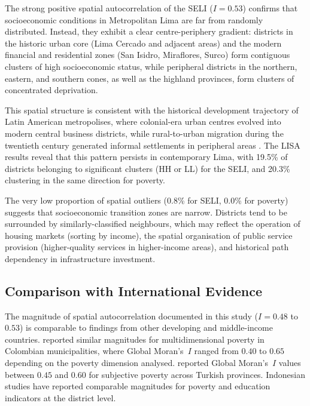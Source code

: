 \documentclass[12pt,a4paper,twoside]{article}
\begin{document}
The strong positive spatial autocorrelation of the SELI ($I = 0.53$) confirms
that socioeconomic conditions in Metropolitan Lima are far from randomly
distributed. Instead, they exhibit a clear centre-periphery gradient: districts
in the historic urban core (Lima Cercado and adjacent areas) and the modern
financial and residential zones (San Isidro, Miraflores, Surco) form contiguous
clusters of high socioeconomic status, while peripheral districts in the northern,
eastern, and southern cones, as well as the highland provinces, form clusters of
concentrated deprivation.

This spatial structure is consistent with the historical development trajectory
of Latin American metropolises, where colonial-era urban centres evolved into
modern central business districts, while rural-to-urban migration during the
twentieth century generated informal settlements in peripheral areas
\citep{gonzalez2025pobreza}. The LISA results reveal that this pattern persists
in contemporary Lima, with 19.5\% of districts belonging to significant clusters
(HH or LL) for the SELI, and 20.3\% clustering in the same direction for poverty.

The very low proportion of spatial outliers (0.8\% for SELI, 0.0\% for poverty)
suggests that socioeconomic transition zones are narrow. Districts tend to be
surrounded by similarly-classified neighbours, which may reflect the operation
of housing markets (sorting by income), the spatial organisation of public
service provision (higher-quality services in higher-income areas), and
historical path dependency in infrastructure investment.

\subsection{Comparison with International Evidence}

The magnitude of spatial autocorrelation documented in this study ($I = 0.48$
to $0.53$) is comparable to findings from other developing and middle-income
countries. \citet{gonzalez2025pobreza} reported similar magnitudes for
multidimensional poverty in Colombian municipalities, where Global Moran's~$I$
ranged from $0.40$ to $0.65$ depending on the poverty dimension analysed.
\citet{tatli2025subjective} reported Global Moran's~$I$ values between $0.45$
and $0.60$ for subjective poverty across Turkish provinces. Indonesian studies
\citep{lestari2023bali, oktavilia2026mapping} have reported comparable
magnitudes for poverty and education indicators at the district level.
\end{document}

